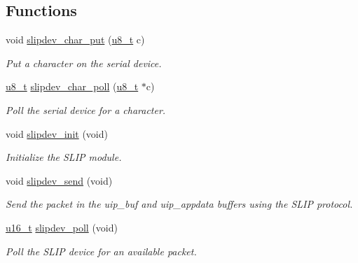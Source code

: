 \subsection*{Functions}
\begin{CompactItemize}
\item 
void \hyperlink{a00068_gd78a209e9faa8a97702424b44134ced3}{slipdev\_\-char\_\-put} (\hyperlink{a00070_ge081489b4906f65a3cb18e9fbe9f8d23}{u8\_\-t} c)
\begin{CompactList}\small\item\em Put a character on the serial device. \item\end{CompactList}\item 
\hyperlink{a00070_ge081489b4906f65a3cb18e9fbe9f8d23}{u8\_\-t} \hyperlink{a00068_g4e8cf1d2e3d874b7aa681a272d957ccb}{slipdev\_\-char\_\-poll} (\hyperlink{a00070_ge081489b4906f65a3cb18e9fbe9f8d23}{u8\_\-t} $\ast$c)
\begin{CompactList}\small\item\em Poll the serial device for a character. \item\end{CompactList}\item 
void \hyperlink{a00068_g24cdb292a83c88750cdc170546038d0d}{slipdev\_\-init} (void)
\begin{CompactList}\small\item\em Initialize the SLIP module. \item\end{CompactList}\item 
void \hyperlink{a00068_gf8c1cf09a7c592ed1ea6b8595aa5f162}{slipdev\_\-send} (void)
\begin{CompactList}\small\item\em Send the packet in the uip\_\-buf and uip\_\-appdata buffers using the SLIP protocol. \item\end{CompactList}\item 
\hyperlink{a00070_gfc6499c1f28697aa3bfc2804d496fd11}{u16\_\-t} \hyperlink{a00068_g0fba24e31e1974adfdae516ddadb5ee2}{slipdev\_\-poll} (void)
\begin{CompactList}\small\item\em Poll the SLIP device for an available packet. \item\end{CompactList}\end{CompactItemize}


